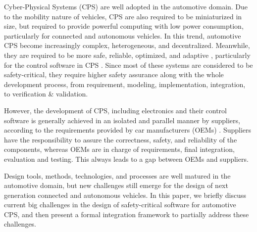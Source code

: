 
\setcounter{section}{0}
\setcounter{figure}{0}
\graphicspath{{./figs/}{./figs/item-toyota/}}


Cyber-Physical Systems (CPS) are well adopted in the automotive domain. Due to the mobility nature of vehicles, CPS are also required to be miniaturized in size, but required to provide powerful computing with low power consumption, particularly for connected and autonomous vehicles. In this trend, automotive CPS become increasingly complex, heterogeneous, and decentralized. Meanwhile, they are required to be more safe, reliable, optimized, and adaptive \cite{darpa-avm}, particularly for the control software in CPS \cite{broy06}. Since most of these systems are considered to be safety-critical, they require higher safety assurance along with the whole development process, from requirement, modeling, implementation, integration, to verification \& validation. 


However, the development of CPS, including electronics and their control software is generally achieved in an isolated and parallel manner by suppliers, according to the requirements provided by car manufacturers (OEMs) \cite{broy06}. Suppliers have the responsibility to assure the correctness, safety, and reliability of the components, whereas OEMs are in charge of requirements, final integration, evaluation and testing. This always leads to a gap between OEMs and suppliers. 

Design tools, methods, technologies, and processes are well matured in the automotive domain, but new challenges still emerge for the design of next generation connected and autonomous vehicles. In this paper, we briefly discuss current big challenges in the design of safety-critical software for automotive CPS, and then present a formal integration framework to partially address these challenges.







